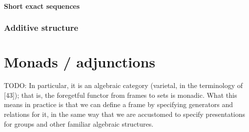\subsubsection{Short exact sequences}

\subsection{Additive structure}

\chapter{Monads / adjunctions}
TODO:   In particular, it is an algebraic category (varietal, in the terminology of [43]); that
is, the foregetful functor from frames to sets is monadic. What this means in
practice is that we can define a frame by specifying generators and relations
for it, in the same way that we are accustomed to specify presentations for
groups and other familiar algebraic structures.